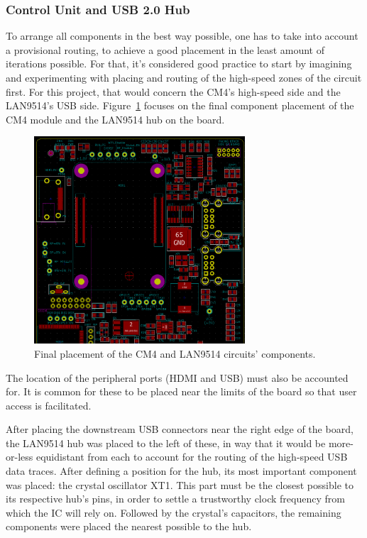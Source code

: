 \subsubsection{Control Unit and USB 2.0 Hub}\label{sec:5111_CM4_LAN9514}

To arrange all components in the best way possible, one has to take into account a provisional routing, to achieve a good placement in the least amount of iterations possible. For that, it's considered good practice to start by imagining and experimenting with placing and routing of the high-speed zones of the circuit first. For this project, that would concern the CM4's high-speed side and the LAN9514's USB side. Figure~\ref{fig:placement_CM4_LAN9514} focuses on the final component placement of the CM4 module and the LAN9514 hub on the board.

\begin{figure}[h]
	\centering
	\includegraphics[width=0.7\textwidth]{Chapters/Figures/chapter5/placement_CM4_LAN9514.png}
	\caption{Final placement of the CM4 and LAN9514 circuits' components.}
	\label{fig:placement_CM4_LAN9514}
\end{figure}%

The location of the peripheral ports (HDMI and USB) must also be accounted for. It is common for these to be placed near the limits of the board so that user access is facilitated.

After placing the downstream USB connectors near the right edge of the board, the LAN9514 hub was placed to the left of these, in way that it would be more-or-less equidistant from each to account for the routing of the high-speed USB data traces. After defining a position for the hub, its most important component was placed: the crystal oscillator XT1. This part must be the closest possible to its respective hub's pins, in order to settle a trustworthy clock frequency from which the IC will rely on. Followed by the crystal's capacitors, the remaining components were placed the nearest possible to the hub.

